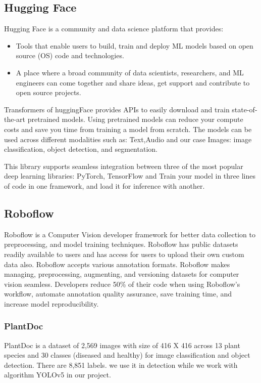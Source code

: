 \subsection{Hugging Face}
Hugging Face is a community and data science platform that provides: \begin{itemize}
    \item Tools that enable users to build, train and deploy ML models based on open source (OS) code and technologies.
    \item A place where a broad community of data scientists, researchers, and ML engineers can come together and share ideas, get support and contribute to open source projects.
\end{itemize}
Transformers of huggingFace provides APIs to easily download and train state-of-the-art pretrained models. Using pretrained models can reduce your compute costs and save you time from training a model from scratch. The models can be used across different modalities such as: Text,Audio and our case Images: image classification, object detection, and segmentation.

This library supports seamless integration between three of the most popular deep learning libraries: PyTorch, TensorFlow and Train your model in three lines of code in one framework, and load it for inference with another. \cite{w11}

\subsection{Roboflow}
Roboflow is a Computer Vision developer framework for better data collection to preprocessing, and model training techniques. Roboflow has public datasets readily available to users and has access for users to upload their own custom data also. Roboflow accepts various annotation formats.
Roboflow makes managing, preprocessing, augmenting, and versioning datasets for computer vision seamless.
Developers reduce 50\% of their code when using Roboflow's workflow, automate annotation quality assurance, save training time, and increase model reproducibility.\cite{w12}
\subsubsection{PlantDoc}
PlantDoc is a dataset of 2,569 images with size of 416 X 416 across 13 plant species and 30 classes (diseased and healthy) for image classification and object detection. There are 8,851 labels. we use it in detection while we work with algorithm YOLOv5 in our project. \cite{w12}

